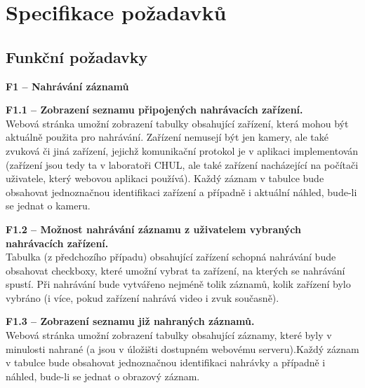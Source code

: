 \documentclass[thesis=M,czech]{FITthesis}[2012/06/26]
\begin{document}
\section{Specifikace požadavků} \label{sec:analyza_pozadavky}
\subsection{Funkční požadavky} \label{subsec:analyza_fp}
\begin{description}
  \item \textbf{F1 -- Nahrávání záznamů}
  \begin{description}
    \item \textbf{F1.1 -- Zobrazení seznamu připojených nahrávacích zařízení.\\}
	Webová stránka umožní zobrazení tabulky obsahující zařízení, která mohou být aktuálně použita pro nahrávání. Zařízení nemusejí být jen kamery, ale také zvuková či jiná zařízení, jejichž komunikační protokol je v aplikaci implementován (zařízení jsou tedy ta v laboratoři CHUL, ale také zařízení nacházející na počítači uživatele, který webovou aplikaci používá). Každý záznam v tabulce bude obsahovat jednoznačnou identifikaci zařízení a případně i aktuální náhled, bude-li se jednat o kameru.
    \item \textbf{F1.2 -- Možnost nahrávání záznamu z uživatelem vybraných nahrávacích zařízení.\\}
	Tabulka (z předchozího případu) obsahující zařízení schopná nahrávání bude obsahovat checkboxy, které umožní vybrat ta zařízení, na kterých se nahrávání spustí. Při nahrávání bude vytvářeno nejméně tolik záznamů, kolik zařízení bylo vybráno (i více, pokud zařízení nahrává video i zvuk současně).
    \item \textbf{F1.3 -- Zobrazení seznamu již nahraných záznamů.\\}
	Webová stránka umožní zobrazení tabulky obsahující záznamy, které byly v minulosti nahrané (a jsou v úložišti dostupném webovému serveru).Každý záznam v tabulce bude obsahovat jednoznačnou identifikaci nahrávky a případně i náhled, bude-li se jednat o obrazový záznam.

  \end{description}


\end{description}
\end{document}
